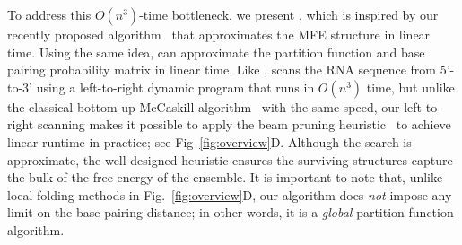 To address this $O(n^3)$-time bottleneck, %
we present \linearpartition, 
which is inspired by our %
recently proposed \linearfold algorithm~\cite{huang+:2019} 
that approximates the MFE structure in linear time.
Using the same idea, \linearpartition can approximate
the partition function and base pairing probability matrix in linear time.
Like \linearfold,
\linearpartition %
scans the RNA sequence from 5'-to-3'
using a left-to-right dynamic program that runs in $O(n^3)$ time,
but unlike the classical bottom-up McCaskill algorithm~\cite{mccaskill:1990} with the same speed,
our left-to-right scanning makes it possible to apply the beam pruning heuristic~\cite{Huang+Sagae:2010} 
to achieve linear runtime in practice; see Fig~\ref{fig:overview}D.
Although the search is approximate,
the well-designed heuristic ensures 
the surviving structures capture the bulk of the free energy of the ensemble.
It is important to note that, unlike local folding methods in Fig.~\ref{fig:overview}D,
our algorithm does {\em not} impose any limit on the base-pairing distance;
in other words, it is a {\em global} partition function algorithm.


